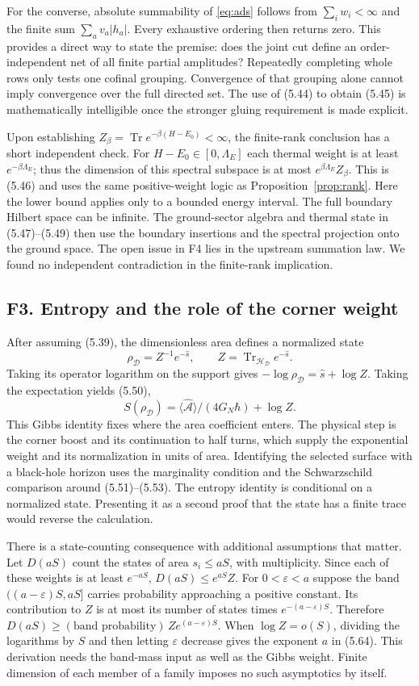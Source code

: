 \documentclass[11pt]{article}
\newcommand{\Tr}{\operatorname{Tr}}
\newcommand{\HH}{\mathcal H_{\mathcal D}}
\newcommand{\areaop}{\hat s}
\begin{document}
For the converse, absolute summability of \eqref{eq:ads} follows from $\sum_i w_i<\infty$ and the finite sum $\sum_a v_a|h_a|$. Every exhaustive ordering then returns zero. This provides a direct way to state the premise: does the joint cut define an order-independent net of all finite partial amplitudes? Repeatedly completing whole rows only tests one cofinal grouping. Convergence of that grouping alone cannot imply convergence over the full directed set. The use of (5.44) to obtain (5.45) is mathematically intelligible once the stronger gluing requirement is made explicit.

Upon establishing $Z_\beta=\Tr e^{-\beta(H-E_0)}<\infty$, the finite-rank conclusion has a short independent check. For $H-E_0\in[0,\Lambda_E]$ each thermal weight is at least $e^{-\beta\Lambda_E}$; thus the dimension of this spectral subspace is at most $e^{\beta\Lambda_E}Z_\beta$. This is (5.46) and uses the same positive-weight logic as Proposition~\ref{prop:rank}. Here the lower bound applies only to a bounded energy interval. The full boundary Hilbert space can be infinite. The ground-sector algebra and thermal state in (5.47)--(5.49) then use the boundary insertions and the spectral projection onto the ground space. The open issue in F4 lies in the upstream summation law. We found no independent contradiction in the finite-rank implication.

\subsection{F3. Entropy and the role of the corner weight}
After assuming (5.39), the dimensionless area defines a normalized state
\[
 \rho_{\mathcal D}=Z^{-1}e^{-\areaop},\qquad
 Z=\Tr_{\HH} e^{-\areaop}.
\]
Taking its operator logarithm on the support gives $-\log\rho_{\mathcal D}=\areaop+\log Z$. Taking the expectation yields (5.50),
\[
 S(\rho_{\mathcal D})=\langle\widehat{\mathcal A}\rangle/(4G_N\hbar)+\log Z .
\]
This Gibbs identity fixes where the area coefficient enters. The physical step is the corner boost and its continuation to half turns, which supply the exponential weight and its normalization in units of area. Identifying the selected surface with a black-hole horizon uses the marginality condition and the Schwarzschild comparison around (5.51)--(5.53). The entropy identity is conditional on a normalized state. Presenting it as a second proof that the state has a finite trace would reverse the calculation.

There is a state-counting consequence with additional assumptions that matter. Let $D(aS)$ count the states of area $s_i\le aS$, with multiplicity. Since each of these weights is at least $e^{-aS}$, $D(aS)\le e^{aS}Z$. For $0<\varepsilon<a$ suppose the band $((a-\varepsilon)S,aS]$ carries probability approaching a positive constant. Its contribution to $Z$ is at most its number of states times $e^{-(a-\varepsilon)S}$. Therefore $D(aS)\ge(\text{band probability})\,Z e^{(a-\varepsilon)S}$. When $\log Z=o(S)$, dividing the logarithms by $S$ and then letting $\varepsilon$ decrease gives the exponent $a$ in (5.64). This derivation needs the band-mass input as well as the Gibbs weight. Finite dimension of each member of a family imposes no such asymptotics by itself.
\end{document}
